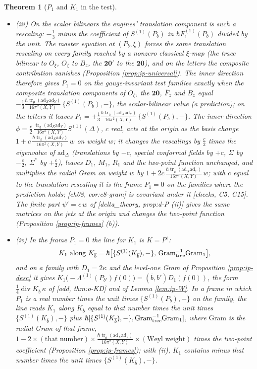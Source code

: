 \documentclass[11pt]{report}
\theoremstyle{plain}
\newtheorem{theorem}{Theorem}[chapter]
\theoremstyle{definition}
\numberwithin{equation}{chapter}
\newcommand{\unit}{\tfrac{\hbar\operatorname{tr}_{\mathfrak g}(\mathrm{ad}_X\mathrm{ad}_Y)}{16\pi^2(X,Y)}}
\newcommand{\Gt}{\mathrm{Gram}_{\rm tree}}
\newcommand{\Go}{\mathrm{Gram}_{1}}
\begin{document}
\begin{theorem}[$P_1$ and $K_1$ in the test]
\begin{itemize}
\item (iii) On the scalar bilinears the engines' translation component is such a rescaling: $-\tfrac13$ minus the coefficient of $S^{(1)}(P_b)$ in $\hbar F_1^{(1)}(P_b)$ divided by the unit. The master equation at $(P_b,\xi)$ forces the same translation rescaling on every family reached by a nonzero classical $\xi$-map (the trace bilinear to $O_\xi$, $O_\zeta$ to $B_z$, the $\mathbf{20'}$ to the $\mathbf{20}$), and on the letters the composite contribution vanishes (Proposition \ref{prop:ip-universal}). The inner direction therefore gives $P_1=0$ on the gauge-invariant test families exactly when the composite translation components of $O_\zeta$, the $\mathbf{20}$, $\overline F_z$ and $B_z$ equal $-\tfrac13\unit\,\{S^{(1)}(P_b),-\}$, the scalar-bilinear value (a prediction); on the letters it leaves $P_1=+\tfrac13\unit\,\{S^{(1)}(P_b),-\}$. The inner direction $\phi=\tfrac c2\,\frac{\operatorname{tr}_{\mathfrak g}(\mathrm{ad}_X\mathrm{ad}_Y)}{16\pi^2(X,Y)}S^{(1)}(\Delta)$, $c$ real, acts at the origin as the basis change $1+c\,\unit\,w$ on weight $w$; it changes the rescalings by $\tfrac c2$ times the eigenvalue of $\mathrm{ad}_\Delta$ (translations by $-c$, special conformal fields by $+c$, $\Sigma$ by $-\tfrac c2$, $\Sigma^*$ by $+\tfrac c2$), leaves $D_1$, $M_1$, $R_1$ and the two-point function unchanged, and multiplies the radial Gram on weight $w$ by $1+2c\,\unit\,w$; with $c$ equal to the translation rescaling it is the frame $P_1=0$ on the families where the prediction holds; [ch08, cor:c8-gram] is covariant under it [checks, C5, C15]. The finite part $\psi'=c\,w$ of [delta\_theory, prop:d-P (ii)] gives the same matrices on the jets at the origin and changes the two-point function (Proposition \ref{prop:ip-frames} (b)).
\item (iv) In the frame $P_1=0$ the line for $K_1$ is $K=P^\dagger$:
\[
K_1\text{ along }K_{\overline b}=\hbar\big[\{S^{(1)}(K_{\overline b}),-\},\,\Gt^{-1}\Go\big],
\]
and on a family with $D_1=2\kappa$ and the level-one Gram of Proposition \ref{prop:ip-desc} it gives $K_1\big(-\Lambda^{(1)}(P_{b'})f(0)\big)=(\overline b,b')D_1(f(0))$, the form $\tfrac14\operatorname{div}K_{\overline b}\,\kappa$ of [odd, thm:o-KD] and of Lemma \ref{lem:ip-W}. In a frame in which $P_1$ is a real number times the unit times $\{S^{(1)}(P_b),-\}$ on the family, the line reads $K_1$ along $K_{\overline b}$ equal to that number times the unit times $\{S^{(1)}(K_{\overline b}),-\}$ plus $\hbar[\{S^{(1)}(K_{\overline b}),-\},\Gt^{-1}\Go]$, where $\mathrm{Gram}$ is the radial Gram of that frame, $1-2\times(\text{that number})\times\unit\times(\text{Weyl weight})$ times the two-point coefficient (Proposition \ref{prop:ip-frames}); with (ii), $K_1$ contains minus that number times the unit times $\{S^{(1)}(K_{\overline b}),-\}$.

\end{itemize}
\end{theorem}
\end{document}
